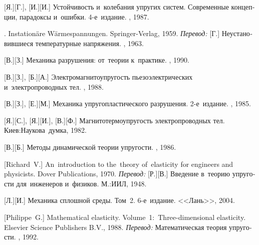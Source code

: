 \begin{thebibliography}{123}
\begin{otherlanguage}{russian}
[Я.][Г.], [И.][И.] Устойчивость и~колебания упругих систем. Современные концепции, парадоксы и~ошибки. 4\hbox{-}е~издание. \naukapublisher, 1987. 

. Instation\"{a}re W\"{a}rmespannungen. Springer\hbox{-}Verlag, 1959. 
\emph{Перевод:} [Г.] Неустановившиеся температурные напряжения. \fizmatgiz, 1963. 

[В.][З.] Механика разрушения: от~теории к~практике. \naukapublisher, 1990. 

[В.][З.], [Б.][А.] Электромагнитоупругость пьезоэлектрических и~электропроводных тел. \naukapublisher, 1988. 

[В.][З.], [Е.][М.] Механика упругопластического разрушения. 2\hbox{-}е~издание. \naukapublisher, 1985. 

[Я.][С.], [Я.][И.], [В.][Ф.]
Магнито\-термо\-упру\-гость электропроводных тел.
Киев:\;Наукова~думка, 1982.

[В.][Б.] Методы динамической теории упругости. \naukapublisher, 1986.

[Richard~V.]
An~introduction to the~theory of~elasticity for engineers and physicists.
Dover Publications, 1970.
\emph{Перевод:}
[Р.][В.]
Введение в~теорию упругости для~инженеров и~физиков.
М.:\;ИИЛ, 1948.

[Л.][И.] Механика сплошной среды. Том~2. 6\hbox{-}е~издание. <<Лань>>, 2004.

[Philippe~G.]
Mathematical elasticity.
Volume~1:~Three\hbox{-}dimensional elasticity.
Elsevier Science Publishers B.\hspace{.1ex}V\hspace{-0.2ex}.,
1988.
\emph{Перевод:}
Математическая теория упругости.
\mirpublisher,
1992.


\end{otherlanguage}
\end{thebibliography}
